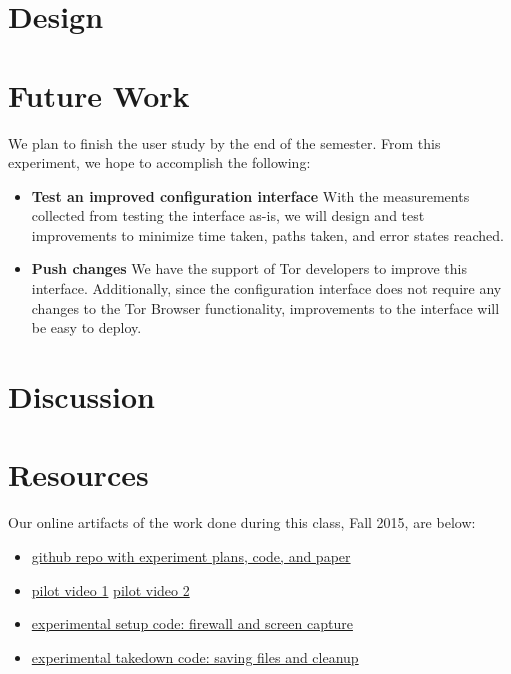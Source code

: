 \documentclass{template}
\begin{document}
\section{Design}

\section{Future Work}

We plan to finish the user study by the end of the semester. 
From this experiment, we hope to accomplish the following: 

\begin{itemize} \itemsep1pt \parskip0pt  
\item {\bfseries Test an improved configuration interface} With the measurements collected
from testing the interface as-is, we will design and test improvements to minimize
time taken, paths taken, and error states reached.
\item {\bfseries Push changes} We have the support of Tor developers
to improve this interface. Additionally, since the configuration interface does not require 
any changes to the Tor Browser functionality, improvements to the interface will
be easy to deploy. 
\end{itemize}


\section{Discussion}

\section{Resources}
\noindent Our online artifacts of the work done during this class, Fall 2015,
are below: 
\begin{itemize} \itemsep1pt \parskip0pt 
\item \href{https://github.com/lindanlee/circumvention-ux-tor}{github repo with experiment plans, code, and paper}
\item \href {https://github.com/lindanlee/circumvention-ux-tor/blob/master/pilot/1-strict.mp4}{pilot video 1}
	\href{https://github.com/lindanlee/circumvention-ux-tor/blob/master/pilot/2-lax.mp4}{pilot video 2}
\item \href{https://github.com/lindanlee/circumvention-ux-tor/blob/master/setup/setup-environment}{experimental setup code: firewall and screen capture} 
\item \href{https://github.com/lindanlee/circumvention-ux-tor/blob/master/setup/takedown-environment}{experimental takedown code: saving files and cleanup} 
\end{itemize}
\end{document}
